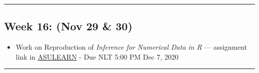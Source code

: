 \documentclass[
]{article}
\providecommand{\tightlist}{%
  \setlength{\itemsep}{0pt}\setlength{\parskip}{0pt}}
\begin{document}
\begin{center}\rule{0.5\linewidth}{0.5pt}\end{center}

\hypertarget{week-16-nov-29-30}{%
\subsection*{Week 16: (Nov 29 \& 30)}\label{week-16-nov-29-30}}

\begin{itemize}
\tightlist
\item
  Work on Reproduction of \emph{Inference for Numerical Data in R} ---
  assignment link in
  \href{https://asulearn.appstate.edu/course/view.php?id=131169}{ASULEARN}
  - Due NLT 5:00 PM Dec 7, 2020
\end{itemize}

\begin{center}\rule{0.5\linewidth}{0.5pt}\end{center}
\end{document}
